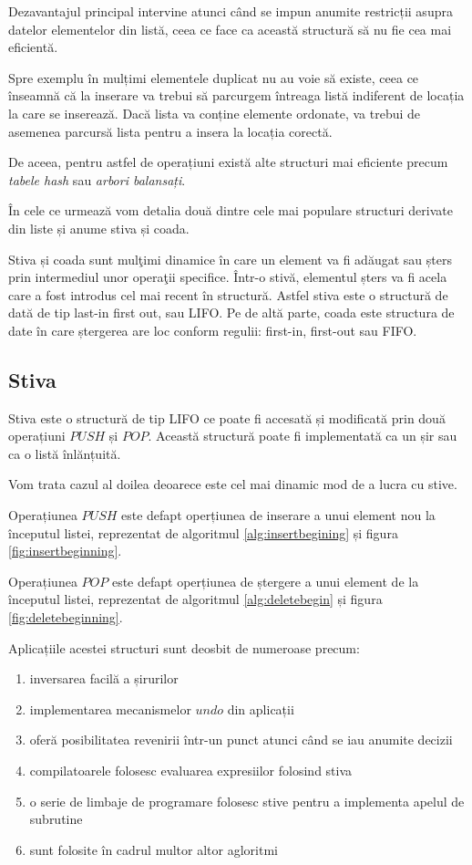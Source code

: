 Dezavantajul principal intervine atunci când se impun anumite restricții asupra datelor elementelor din listă, ceea ce face ca această structură să nu fie cea mai eficientă. 

Spre exemplu în mulțimi elementele duplicat nu au voie să existe, ceea ce înseamnă că la inserare va trebui să parcurgem întreaga listă indiferent de locația la care se inserează. Dacă lista va conține elemente ordonate, va trebui de asemenea parcursă lista pentru a insera la locația corectă. 

De aceea, pentru astfel de operațiuni există alte structuri mai eficiente precum \textit{tabele hash}  sau \textit{arbori balansați}.

În cele ce urmează vom detalia două dintre cele mai populare structuri derivate din liste și anume stiva și coada.


Stiva și coada sunt mulţimi dinamice în care un element va fi adăugat sau șters prin intermediul unor operaţii specifice. Într-o stivă, elementul șters va fi acela care a fost introdus cel mai recent în structură. Astfel stiva este o structură de dată de tip last-in first out, sau LIFO. Pe de altă parte, coada este structura de date în care ștergerea are loc conform regulii: first-in, first-out sau FIFO.



\newpage




\subsection{Stiva}

Stiva este o structură de tip LIFO ce poate fi accesată și modificată prin două operațiuni $PUSH$ și $POP$. Această structură poate fi implementată ca un șir sau ca o listă înlănțuită. 

Vom trata cazul al doilea deoarece este cel mai dinamic mod de a lucra cu stive.

Operațiunea $PUSH$ este defapt operțiunea de inserare a unui element nou la începutul listei, reprezentat de algoritmul \ref{alg:insertbegining} și figura \ref{fig:insertbeginning}.

Operațiunea $POP$ este defapt operțiunea de ștergere a unui element de la începutul listei, reprezentat de algoritmul \ref{alg:deletebegin} și figura \ref{fig:deletebeginning}.

Aplicațiile acestei structuri sunt deosbit de numeroase precum:
\begin{enumerate}
	\item inversarea facilă a șirurilor
	\item implementarea mecanismelor $undo$ din aplicații
	\item oferă posibilitatea revenirii într-un punct atunci când se iau anumite decizii
	\item compilatoarele folosesc evaluarea expresiilor folosind stiva
	\item o serie de limbaje de programare folosesc stive pentru a implementa apelul de subrutine
	\item sunt folosite în cadrul multor altor agloritmi
\end{enumerate} 

